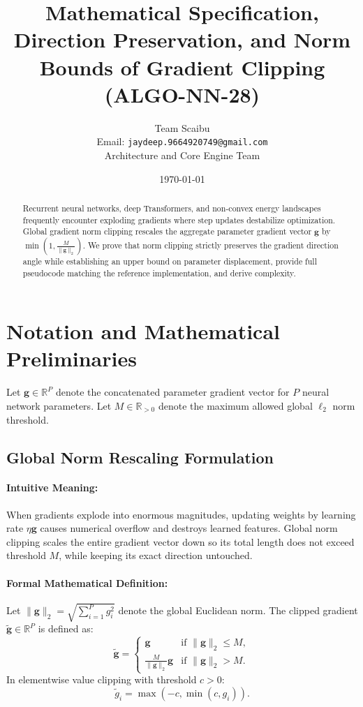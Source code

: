 \documentclass[11pt]{article}
\title{\textbf{Mathematical Specification, Direction Preservation, and Norm Bounds of Gradient Clipping (ALGO-NN-28)}}
\author{Team Scaibu \\ \small Email: \texttt{jaydeep.9664920749@gmail.com} \\ \small Architecture and Core Engine Team}
\date{\today}
\begin{document}
\maketitle

\begin{abstract}
Recurrent neural networks, deep Transformers, and non-convex energy landscapes frequently encounter exploding gradients where step updates destabilize optimization. Global gradient norm clipping rescales the aggregate parameter gradient vector $\mathbf{g}$ by $\min\left(1, \frac{M}{\|\mathbf{g}\|_2}\right)$. We prove that norm clipping strictly preserves the gradient direction angle while establishing an upper bound on parameter displacement, provide full pseudocode matching the reference implementation, and derive complexity.
\end{abstract}

\section{Notation and Mathematical Preliminaries}
\label{sec:notation}

Let $\mathbf{g} \in \mathbb{R}^P$ denote the concatenated parameter gradient vector for $P$ neural network parameters. Let $M \in \mathbb{R}_{>0}$ denote the maximum allowed global $\ell_2$ norm threshold.

\subsection{Global Norm Rescaling Formulation}
\paragraph{Intuitive Meaning:} When gradients explode into enormous magnitudes, updating weights by learning rate $\eta \mathbf{g}$ causes numerical overflow and destroys learned features. Global norm clipping scales the entire gradient vector down so its total length does not exceed threshold $M$, while keeping its exact direction untouched.

\paragraph{Formal Mathematical Definition:}
Let $\|\mathbf{g}\|_2 = \sqrt{\sum_{i=1}^P g_i^2}$ denote the global Euclidean norm.
The clipped gradient $\tilde{\mathbf{g}} \in \mathbb{R}^P$ is defined as:
\begin{equation}
\label{eq:norm_clipping}
\tilde{\mathbf{g}} = \begin{cases} \mathbf{g} & \text{if } \|\mathbf{g}\|_2 \le M, \\ \frac{M}{\|\mathbf{g}\|_2} \mathbf{g} & \text{if } \|\mathbf{g}\|_2 > M. \end{cases}
\end{equation}
In elementwise value clipping with threshold $c > 0$:
\begin{equation}
\label{eq:value_clipping}
\tilde{g}_i = \max(-c, \min(c, g_i)).
\end{equation}
\end{document}
